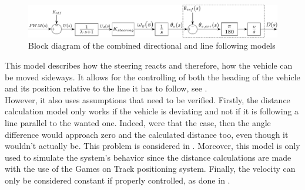 \begin{figure}[H]
  \centering
  \includegraphics[width=1\textwidth]{figures/steeringModelWithLineFollowing.pdf}
  \caption{Block diagram of the combined directional and line following models}
  \label{fig:steeringLineFollowingModel}
\end{figure}

This model describes how the steering reacts and therefore, how the vehicle can be moved sideways. It allows for the controlling of both the heading of the vehicle and its position relative to the line it has to follow, see .\\
However, it also uses assumptions that need to be verified. Firstly, the distance calculation model only works if the vehicle is deviating and not if it is following a line parallel to the wanted one.  Indeed, were that the case, then the angle difference would approach zero and the calculated distance too, even though it wouldn't actually be. This problem is considered in . Moreover, this model is only used to simulate the system's behavior since the distance calculations are made with the use of the Games on Track positioning system. Finally, the velocity can only be considered constant if properly controlled, as done in .